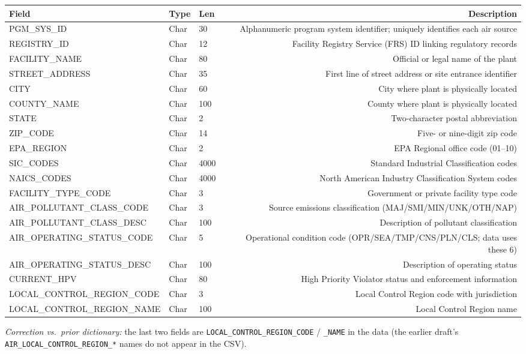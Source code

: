 \documentclass[11pt]{article}
\begin{document}
\begin{longtable}{F T L D}
\toprule
Field & Type & Len & Description \\ \midrule \endhead
PGM\_SYS\_ID & Char & 30 & Alphanumeric program system identifier; uniquely identifies each air source \\
REGISTRY\_ID & Char & 12 & Facility Registry Service (FRS) ID linking regulatory records \\
FACILITY\_NAME & Char & 80 & Official or legal name of the plant \\
STREET\_ADDRESS & Char & 35 & First line of street address or site entrance identifier \\
CITY & Char & 60 & City where plant is physically located \\
COUNTY\_NAME & Char & 100 & County where plant is physically located \\
STATE & Char & 2 & Two-character postal abbreviation \\
ZIP\_CODE & Char & 14 & Five- or nine-digit zip code \\
EPA\_REGION & Char & 2 & EPA Regional office code (01--10) \\
SIC\_CODES & Char & 4000 & Standard Industrial Classification codes \\
NAICS\_CODES & Char & 4000 & North American Industry Classification System codes \\
FACILITY\_TYPE\_CODE & Char & 3 & Government or private facility type code \\
AIR\_POLLUTANT\_CLASS\_CODE & Char & 3 & Source emissions classification (MAJ/SMI/MIN/UNK/OTH/NAP) \\
AIR\_POLLUTANT\_CLASS\_DESC & Char & 100 & Description of pollutant classification \\
AIR\_OPERATING\_STATUS\_CODE & Char & 5 & Operational condition code (OPR/SEA/TMP/CNS/PLN/CLS; data uses these 6) \\
AIR\_OPERATING\_STATUS\_DESC & Char & 100 & Description of operating status \\
CURRENT\_HPV & Char & 80 & High Priority Violator status and enforcement information \\
LOCAL\_CONTROL\_REGION\_CODE & Char & 3 & Local Control Region code with jurisdiction \\
LOCAL\_CONTROL\_REGION\_NAME & Char & 100 & Local Control Region name \\
\bottomrule
\end{longtable}
\noindent\emph{Correction vs.\ prior dictionary:} the last two fields are
\texttt{LOCAL\_CONTROL\_REGION\_CODE} / \texttt{\_NAME} in the data (the earlier draft's
\texttt{AIR\_LOCAL\_CONTROL\_REGION\_*} names do not appear in the CSV).
\end{document}
